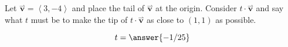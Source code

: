 \documentclass{ximera}
\author{Bart Snapp}
\begin{document}
\begin{exercise}
Let $\overset{\boldsymbol{\rightharpoonup}}{\mathbf{v}} = \left< 3,-4 \right>$ and place the tail of $\overset{\boldsymbol{\rightharpoonup}}{\mathbf{v}}$ at the
  origin. Consider $t\cdot \overset{\boldsymbol{\rightharpoonup}}{\mathbf{v}}$ and say what $t$ must be to make
  the tip of $t\cdot \overset{\boldsymbol{\rightharpoonup}}{\mathbf{v}}$ as close to $(1,1)$ as possible.
  \begin{prompt}
    \[
    t=\answer{-1/25}
    \]
  \end{prompt}
\end{exercise}
\end{document}
